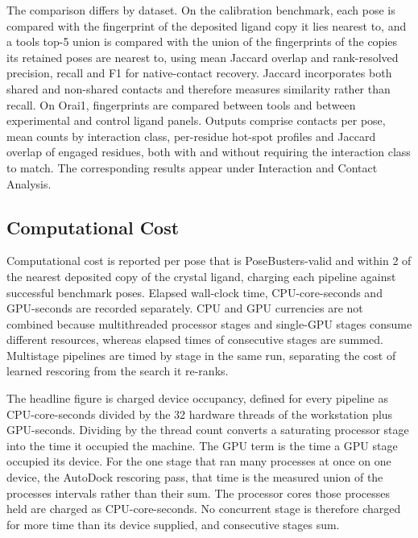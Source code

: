The comparison differs by dataset. On the calibration benchmark, each pose is compared with the fingerprint of the deposited ligand copy it lies nearest to, and a tool\textquotesingle s top-5 union is compared with the union of the fingerprints of the copies its retained poses are nearest to, using mean Jaccard overlap and rank-resolved precision, recall and F1 for native-contact recovery. Jaccard incorporates both shared and non-shared contacts and therefore measures similarity rather than recall. On Orai1, fingerprints are compared between tools and between experimental and control ligand panels. Outputs comprise contacts per pose, mean counts by interaction class, per-residue hot-spot profiles and Jaccard overlap of engaged residues, both with and without requiring the interaction class to match. The corresponding results appear under Interaction and Contact Analysis.

\hypertarget{computational-cost}{%
\subsection{Computational Cost}\label{computational-cost}}

Computational cost is reported per pose that is PoseBusters-valid and within 2\angstrom{} of the nearest deposited copy of the crystal ligand, charging each pipeline against successful benchmark poses. Elapsed wall-clock time, CPU-core-seconds and GPU-seconds are recorded separately. CPU and GPU currencies are not combined because multithreaded processor stages and single-GPU stages consume different resources, whereas elapsed times of consecutive stages are summed. Multistage pipelines are timed by stage in the same run, separating the cost of learned rescoring from the search it re-ranks.

The headline figure is charged device occupancy, defined for every pipeline as CPU-core-seconds divided by the 32 hardware threads of the workstation plus GPU-seconds. Dividing by the thread count converts a saturating processor stage into the time it occupied the machine. The GPU term is the time a GPU stage occupied its device. For the one stage that ran many processes at once on one device, the AutoDock rescoring pass, that time is the measured union of the processes\textquotesingle{} intervals rather than their sum. The processor cores those processes held are charged as CPU-core-seconds. No concurrent stage is therefore charged for more time than its device supplied, and consecutive stages sum.


